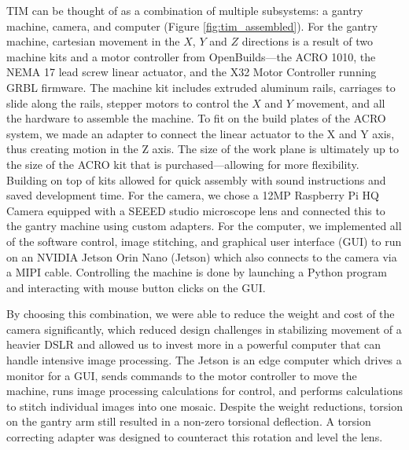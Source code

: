 \documentclass[a4paper,12pt]{article}
\begin{document}
TIM can be thought of as a combination of multiple subsystems: a gantry machine, camera, and computer (Figure \ref{fig:tim_assembled}). 
For the gantry machine, cartesian movement in the $X$, $Y$ and $Z$ directions is a result of two machine kits and a motor controller from OpenBuilds---the ACRO 1010, the NEMA 17 lead screw linear actuator, and the X32 Motor Controller running GRBL firmware. 
The machine kit includes extruded aluminum rails, carriages to slide along the rails, stepper motors to control the $X$ and $Y$ movement, and all the hardware to assemble the machine. 
To fit on the build plates of the ACRO system, we made an adapter to connect the linear actuator to the X and Y axis, thus creating motion in the Z axis.
The size of the work plane is ultimately up to the size of the ACRO kit that is purchased---allowing for more flexibility.
Building on top of kits allowed for quick assembly with sound instructions and saved development time. 
For the camera, we chose a 12MP Raspberry Pi HQ Camera equipped with a SEEED studio microscope lens and connected this to the gantry machine using custom adapters.
For the computer, we implemented all of the software control, image stitching, and graphical user interface (GUI) to run on an NVIDIA Jetson Orin Nano (Jetson) which also connects to the camera via a MIPI cable.
Controlling the machine is done by launching a Python program and interacting with mouse button clicks on the GUI. 

By choosing this combination, we were able to reduce the weight and cost of the camera significantly, which reduced design challenges in stabilizing movement of a heavier DSLR and allowed us to invest more in a powerful computer that can handle intensive image processing. 
The Jetson is an edge computer which drives a monitor for a GUI, sends commands to the motor controller to move the machine, runs image processing calculations for control, and performs calculations to stitch individual images into one mosaic. 
Despite the weight reductions, torsion on the gantry arm still resulted in a non-zero torsional deflection. A torsion correcting adapter was designed to counteract this rotation and level the lens.
\end{document}
